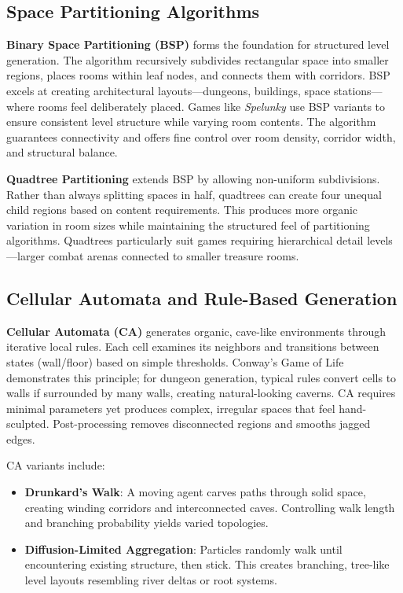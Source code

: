 \documentclass[11pt]{article}
\begin{document}
\subsection{Space Partitioning Algorithms}

\textbf{Binary Space Partitioning (BSP)} forms the foundation for structured level generation. The algorithm recursively subdivides rectangular space into smaller regions, places rooms within leaf nodes, and connects them with corridors. BSP excels at creating architectural layouts—dungeons, buildings, space stations—where rooms feel deliberately placed. Games like \textit{Spelunky} use BSP variants to ensure consistent level structure while varying room contents. The algorithm guarantees connectivity and offers fine control over room density, corridor width, and structural balance.

\textbf{Quadtree Partitioning} extends BSP by allowing non-uniform subdivisions. Rather than always splitting spaces in half, quadtrees can create four unequal child regions based on content requirements. This produces more organic variation in room sizes while maintaining the structured feel of partitioning algorithms. Quadtrees particularly suit games requiring hierarchical detail levels—larger combat arenas connected to smaller treasure rooms.

\subsection{Cellular Automata and Rule-Based Generation}

\textbf{Cellular Automata (CA)} generates organic, cave-like environments through iterative local rules. Each cell examines its neighbors and transitions between states (wall/floor) based on simple thresholds. Conway's Game of Life demonstrates this principle; for dungeon generation, typical rules convert cells to walls if surrounded by many walls, creating natural-looking caverns. CA requires minimal parameters yet produces complex, irregular spaces that feel hand-sculpted. Post-processing removes disconnected regions and smooths jagged edges.

CA variants include:
\begin{itemize}
    \item \textbf{Drunkard's Walk}: A moving agent carves paths through solid space, creating winding corridors and interconnected caves. Controlling walk length and branching probability yields varied topologies.
    \item \textbf{Diffusion-Limited Aggregation}: Particles randomly walk until encountering existing structure, then stick. This creates branching, tree-like level layouts resembling river deltas or root systems.
\end{itemize}
\end{document}
